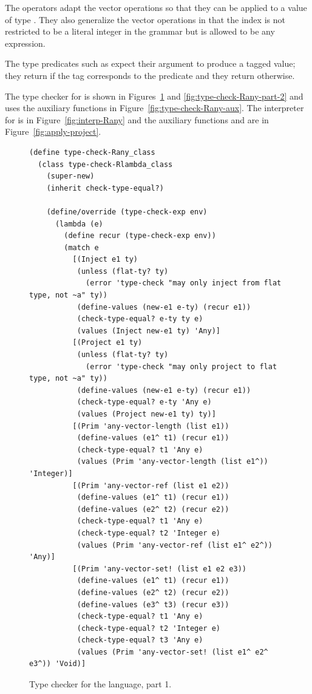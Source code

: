 \documentclass[7x10,nocrop]{TimesAPriori_MIT}%
\begin{document}
The  operators adapt the vector operations so that
they can be applied to a value of type .  They also
generalize the vector operations in that the index is not restricted
to be a literal integer in the grammar but is allowed to be any
expression.

The type predicates such as  expect their argument to
produce a tagged value; they return  if the tag corresponds
to the predicate and they return  otherwise.

The type checker for \LangAny{} is shown in
Figures~\ref{fig:type-check-Rany-part-1} and
\ref{fig:type-check-Rany-part-2} and uses the auxiliary functions in
Figure~\ref{fig:type-check-Rany-aux}.
%
The interpreter for \LangAny{} is in Figure~\ref{fig:interp-Rany} and the
auxiliary functions  and  are
in Figure~\ref{fig:apply-project}.


\begin{figure}[btp]
 \begin{lstlisting}[basicstyle=\ttfamily\small]
(define type-check-Rany_class
  (class type-check-Rlambda_class
    (super-new)
    (inherit check-type-equal?)

    (define/override (type-check-exp env)
      (lambda (e)
        (define recur (type-check-exp env))
        (match e
          [(Inject e1 ty)
           (unless (flat-ty? ty)
             (error 'type-check "may only inject from flat type, not ~a" ty))
           (define-values (new-e1 e-ty) (recur e1))
           (check-type-equal? e-ty ty e)
           (values (Inject new-e1 ty) 'Any)]
          [(Project e1 ty)
           (unless (flat-ty? ty)
             (error 'type-check "may only project to flat type, not ~a" ty))
           (define-values (new-e1 e-ty) (recur e1))
           (check-type-equal? e-ty 'Any e)
           (values (Project new-e1 ty) ty)]
          [(Prim 'any-vector-length (list e1))
           (define-values (e1^ t1) (recur e1))
           (check-type-equal? t1 'Any e)
           (values (Prim 'any-vector-length (list e1^)) 'Integer)]
          [(Prim 'any-vector-ref (list e1 e2))
           (define-values (e1^ t1) (recur e1))
           (define-values (e2^ t2) (recur e2))
           (check-type-equal? t1 'Any e)
           (check-type-equal? t2 'Integer e)
           (values (Prim 'any-vector-ref (list e1^ e2^)) 'Any)]
          [(Prim 'any-vector-set! (list e1 e2 e3))
           (define-values (e1^ t1) (recur e1))
           (define-values (e2^ t2) (recur e2))
           (define-values (e3^ t3) (recur e3))
           (check-type-equal? t1 'Any e)
           (check-type-equal? t2 'Integer e)
           (check-type-equal? t3 'Any e)
           (values (Prim 'any-vector-set! (list e1^ e2^ e3^)) 'Void)]
\end{lstlisting}
\caption{Type checker for the \LangAny{} language, part 1.}
\label{fig:type-check-Rany-part-1}
\end{figure}
\end{document}
